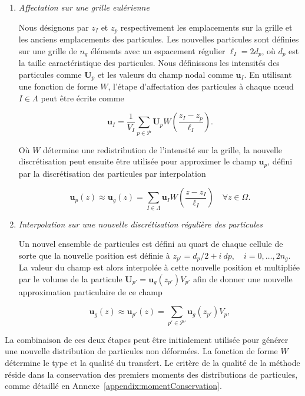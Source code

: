 \begin{enumerate}[label=(\alph*)]
    \item \textit{Affectation sur une grille eulérienne}~\label{assigment}

          Nous désignons par $z_{I}$ et $z_{p}$ respectivement les emplacements sur la grille et les anciens emplacements des particules. Les nouvelles particules sont définies sur une grille de $n_g$ éléments avec un espacement régulier $\ell_I = 2 d_p$, où $d_p$ est la taille caractéristique des particules. Nous définissons les intensités des particules comme $\bm U_p$ et les valeurs du champ nodal comme $\bm u_I$. En utilisant une fonction de forme $W$, l'étape d'affectation des particules à chaque nœud $I \in \Lambda$ peut être écrite comme

          \[
              \bm{u}_I = \frac{1}{V_I} \sum_{p \in \mathcal{P}} \bm U_p  W \left(\frac{z_I - z_p}{\ell_I} \right).
          \]

          Où $W$ détermine une redistribution de l'intensité sur la grille, la nouvelle discrétisation peut ensuite être utilisée pour approximer le champ $\bm{u}_p$, défini par la discrétisation des particules par interpolation

          \[
              \bm{u}_p(z) \approx \bm{u}_g(z) = \sum_{I \in \Lambda} \bm u_I W \left(\frac{z - z_I}{\ell_I} \right) \quad \forall z \in \Omega.
          \]

    \item \textit{Interpolation sur une nouvelle discrétisation régulière des particules}~\label{interpolation}

          Un nouvel ensemble de particules est défini au quart de chaque cellule de sorte que la nouvelle position est définie à $z_{p'} = d_p/2 + i~dp, \quad i = 0,\dots, 2n_g $. La valeur du champ est alors interpolée à cette nouvelle position et multipliée par le volume de la particule $\bm{U}_{p'} = \bm  u_g(z_{p'}) V_{p'}$ afin de donner une nouvelle approximation particulaire de ce champ

          \[
              \bm{u}_g(z)  \approx \bm{u}_{p'}(z) = \sum_{p'\in\mathcal{P'}} \bm{u}_g(z_{p'}) V_p,
          \]

\end{enumerate}

La combinaison de ces deux étapes peut être initialement utilisée pour générer une nouvelle distribution de particules non déformées. La fonction de forme $W$ détermine le type et la qualité du transfert. Le critère de la qualité de la méthode réside dans la conservation des premiers moments des distributions de particules, comme détaillé en Annexe~\ref{appendix:momentConservation}.

